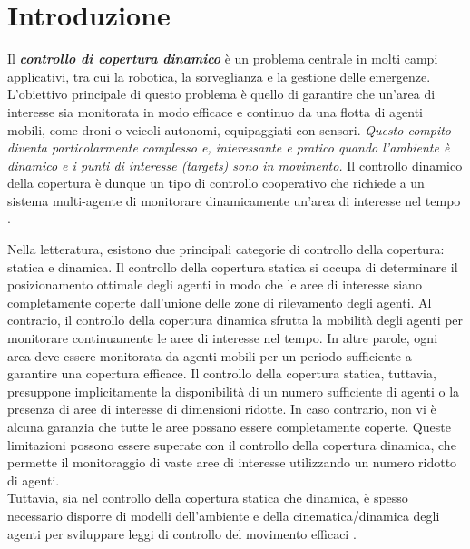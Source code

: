 \documentclass[twoside]{article}
\begin{document}

\newpage
\mbox{}
\newpage

\section*{\LARGE Introduzione}

\vspace{\baselineskip}

Il \textit{\textbf{controllo di copertura dinamico}} è un problema centrale in molti campi applicativi, tra cui la robotica, la sorveglianza e la gestione delle emergenze. L'obiettivo principale di questo problema è quello di garantire che un'area di interesse sia monitorata in modo efficace e continuo da una flotta di agenti mobili, come droni o veicoli autonomi, equipaggiati con sensori. \textit{Questo compito diventa particolarmente complesso e, interessante e pratico quando l'ambiente è dinamico e i punti di interesse (targets) sono in movimento.}
Il controllo dinamico della copertura è dunque un tipo di controllo cooperativo che richiede a un sistema multi-agente di monitorare dinamicamente un'area di interesse nel tempo \cite{Articolo_1}. 

\vspace{\baselineskip}

Nella letteratura, esistono due principali categorie di controllo della copertura: statica e dinamica. Il controllo della copertura statica si occupa di determinare il posizionamento ottimale degli agenti in modo che le aree di interesse siano completamente coperte dall'unione delle zone di rilevamento degli agenti. Al contrario, il controllo della copertura dinamica sfrutta la mobilità degli agenti per monitorare continuamente le aree di interesse nel tempo. In altre parole, ogni area deve essere monitorata da agenti mobili per un periodo sufficiente a garantire una copertura efficace.
Il controllo della copertura statica, tuttavia, presuppone implicitamente la disponibilità di un numero sufficiente di agenti o la presenza di aree di interesse di dimensioni ridotte. In caso contrario, non vi è alcuna garanzia che tutte le aree possano essere completamente coperte. Queste limitazioni possono essere superate con il controllo della copertura dinamica, che permette il monitoraggio di vaste aree di interesse utilizzando un numero ridotto di agenti.\\
Tuttavia, sia nel controllo della copertura statica che dinamica, è spesso necessario disporre di modelli dell'ambiente e della cinematica/dinamica degli agenti per sviluppare leggi di controllo del movimento efficaci \cite{Articolo_1}.
\end{document}
